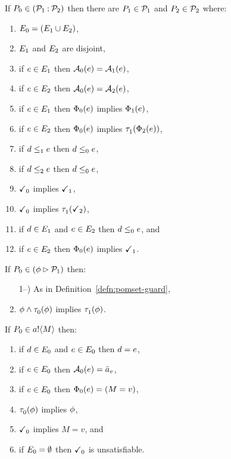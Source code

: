 \begin{definition}
  If $P_0 \in (\mathcal{P}_1\mathbin{;}\mathcal{P}_2)$ then
  there are $P_1\in\mathcal{P}_1$ and $P_2\in\mathcal{P}_2$ where:
  \begin{enumerate}
  \item $E_0 = (E_1\cup E_2)$,
  \item $E_1$ and  $E_2$ are disjoint,
  \item if $e\in E_1$ then $\mathcal{A}_0(e) = \mathcal{A}_1(e)$, 
  \item if $e\in E_2$ then $\mathcal{A}_0(e) = \mathcal{A}_2(e)$,
  \item if $e\in E_1$ then $\Phi_0(e)$ implies $\Phi_1(e)$, 
  \item if $e\in E_2$ then $\Phi_0(e)$ implies $\tau^{}_1(\Phi_2(e))$,
  \item if $d\le_1e$ then $d\le_0e$,
  \item if $d\le_2e$ then $d\le_0e$,
  \item $\checkmark_0$ implies $\checkmark_1$,
  \item $\checkmark_0$ implies $\tau^{}_1(\checkmark_2)$,
  \item if $d\in E_1$ and $e\in E_2$ then $d\le_0e$, and
  \item if $e\in E_2$ then $\Phi_0(e)$ implies $\checkmark_1$.
  \end{enumerate}
\end{definition}

\begin{definition}
  If $P_0 \in (\phi\mathbin\rhd\mathcal{P}_1)$ then:
  \begin{enumerate}
    \setcounter{enumi}{\value{pomsetGuardCount}}
  \item[1--\thepomsetGuardCount)] As in Definition~\ref{defn:pomset-guard},
  \item $\phi\land\tau^{}_0(\phi)$ implies $\tau^{}_1(\phi)$.
  \end{enumerate}
\end{definition}

\begin{definition}
  If $\aPS_0 \in \sSEND\aChan{\aExp}$ then:
  \begin{enumerate}
  \item if $d\in E_0$ and $e\in E_0$ then $d=e$,
  \item if $e\in E_0$ then $\mathcal{A}_0(e) = \bar{a}_{v}$,
  \item if $e\in E_0$ then $\Phi_0(e) = (M = v)$,
  \item $\tau^{}_0(\phi)$ implies $\phi$,
  \item $\checkmark_0$ implies $M = v$, and
  \item if $E_0=\emptyset$ then $\checkmark_0$ is unsatisfiable.
  \end{enumerate}
\end{definition}


